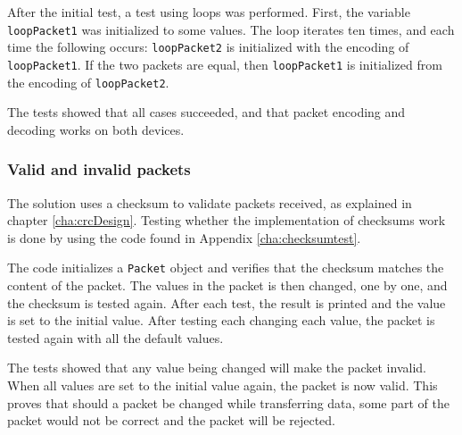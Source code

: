 After the initial test, a test using loops was performed. First, the variable  \texttt{loopPacket1} was initialized to some values. The loop iterates ten times, and each time the following occurs: \texttt{loopPacket2} is initialized with the encoding of \texttt{loopPacket1}. If the two packets are equal, then \texttt{loopPacket1} is initialized from the encoding of \texttt{loopPacket2}. 

The tests showed that all cases succeeded, and that packet encoding and decoding works on both devices.

\subsubsection*{Valid and invalid packets}
The solution uses a checksum to validate packets received, as explained in chapter \ref{cha:crcDesign}. Testing whether the implementation of checksums work is done by using the code found in Appendix \ref{cha:checksumtest}.


The code initializes a \texttt{Packet} object and verifies that the checksum matches the content of the packet. The values in the packet is then changed, one by one, and the checksum is tested again. After each test, the result is printed and the value is set to the initial value. After testing each changing each value, the packet is tested again with all the default values.

The tests showed that any value being changed will make the packet invalid. When all values are set to the initial value again, the packet is now valid.
This proves that should a packet be changed while transferring data, some part of the packet would not be correct and the packet will be rejected.

